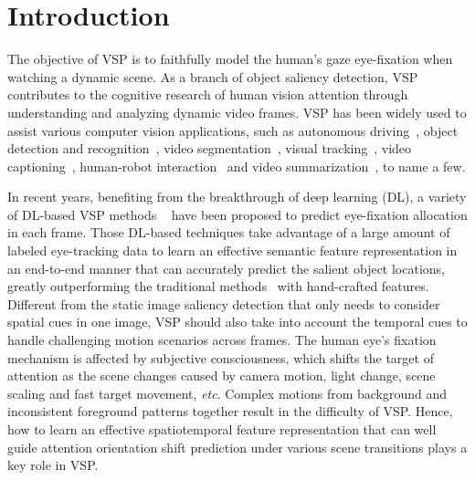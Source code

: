 \documentclass[review]{elsarticle}
\begin{document}
\section{Introduction}
The objective of VSP is to faithfully model the human's gaze eye-fixation when watching a dynamic scene.
As a branch of object saliency detection, VSP contributes to the cognitive research of human vision attention through understanding and analyzing dynamic video frames.
VSP has been widely used to assist various computer vision applications, such as autonomous driving~\cite{deng2016does}, object detection and recognition~\cite{aguilar2017pedestrian,flores2019saliency}, video segmentation~\cite{wang2017saliency,hu2018unsupervised}, visual tracking~\cite{zhang2019non}, video captioning~\cite{gao2017video}, human-robot interaction~\cite{schillaci2013evaluating} and video summarization~\cite{marat2007video}, to name a few.


In recent years, benefiting from the breakthrough of deep learning (DL), a variety of DL-based VSP methods ~\cite{huang2015salicon,liu2015predicting,pan2016shallow,kruthiventi2017deepfix,wang2017deep} have been proposed to predict eye-fixation allocation in each frame.
Those DL-based techniques take advantage of a large amount of labeled eye-tracking data to learn an effective semantic feature representation in an end-to-end manner that can accurately predict the salient object locations, greatly outperforming the traditional methods~\cite{itti2003realistic,zhang2009sunday,ren2013regularized,yan2018unsupervised} with hand-crafted features.
Different from the static image saliency detection that only needs to consider spatial cues in one image, VSP should also take into account the temporal cues to handle challenging motion scenarios across frames.
The human eye's fixation mechanism is affected by subjective consciousness, which shifts the target of attention as the scene changes caused by camera motion, light change, scene scaling and fast target movement, \textit{etc}.
Complex motions from background and inconsistent foreground patterns together result in the difficulty of VSP.
Hence, how to learn an effective spatiotemporal feature representation that can well guide attention orientation shift prediction under various scene transitions plays a key role in VSP.
\end{document}
